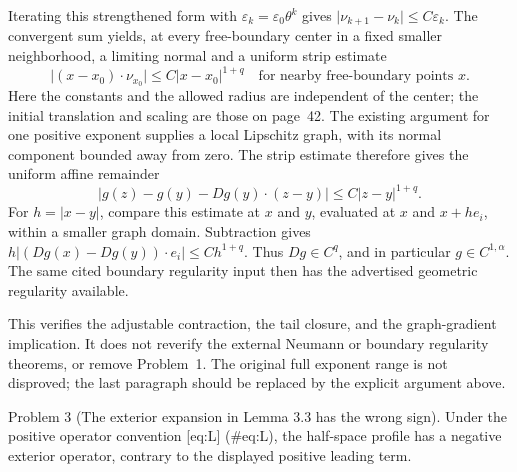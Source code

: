 \documentclass[10pt]{article}
\begin{document}
Iterating this strengthened form with \(\varepsilon_k=\varepsilon_0\theta^k\) gives \(\lvert\nu_{k+1}-\nu_k\rvert\le C\varepsilon_k\). The convergent sum yields, at every free-boundary center in a fixed smaller neighborhood, a limiting normal and a uniform strip estimate \[\bigl|(x-x_0)\cdot\nu_{x_0}\bigr|
       \le C|x-x_0|^{1+q}
 \quad\text{for nearby free-boundary points }x .\] Here the constants and the allowed radius are independent of the center; the initial translation and scaling are those on page 42. The existing argument for one positive exponent supplies a local Lipschitz graph, with its normal component bounded away from zero. The strip estimate therefore gives the uniform affine remainder \[|g(z)-g(y)-Dg(y)\cdot(z-y)|\le C|z-y|^{1+q}.\] For \(h=|x-y|\), compare this estimate at \(x\) and \(y\), evaluated at \(x\) and \(x+h e_i\), within a smaller graph domain. Subtraction gives \(h|(Dg(x)-Dg(y))\cdot e_i|\le C h^{1+q}\). Thus \(Dg\in C^q\), and in particular \(g\in C^{1,\alpha}\). The same cited boundary regularity input then has the advertised geometric regularity available.\par
This verifies the adjustable contraction, the tail closure, and the graph-gradient implication. It does not reverify the external Neumann or boundary regularity theorems, or remove Problem 1. The original full exponent range is not disproved; the last paragraph should be replaced by the explicit argument above.\par
Problem 3 (The exterior expansion in Lemma 3.3 has the wrong sign).  Under the positive operator convention [eq:L] (\#eq:L), the half-space profile has a negative exterior operator, contrary to the displayed positive leading term.\par
\end{document}
